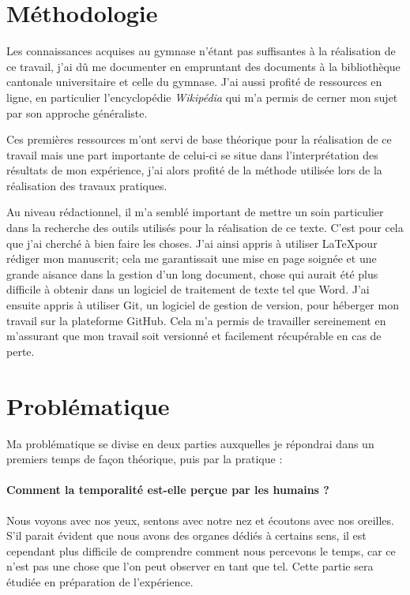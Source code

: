 \documentclass[12pt,fleqn,oneside,openany,]{book} %
\begin{document}
\section{Méthodologie} \label{sec:methodologie}
Les connaissances acquises au gymnase n'étant pas suffisantes à la réalisation de ce travail, j'ai dû me documenter en empruntant des documents à la bibliothèque cantonale universitaire et celle du gymnase. J'ai aussi profité de ressources en ligne, en particulier l'encyclopédie \textit{Wikipédia} qui m'a permis de cerner mon sujet par son approche généraliste.

Ces premières ressources m'ont servi de base théorique pour la réalisation de ce travail mais une part importante de celui-ci se situe dans l'interprétation des résultats de mon expérience, j'ai alors profité de la méthode utilisée lors de la réalisation des travaux pratiques.

Au niveau rédactionnel, il m'a semblé important de mettre un soin particulier dans la recherche des outils utilisés pour la réalisation de ce texte. C'est pour cela que j'ai cherché à bien faire les choses. J'ai ainsi appris à utiliser \LaTeX pour rédiger mon manuscrit; cela me garantissait une mise en page soignée et une grande aisance dans la gestion d'un long document, chose qui aurait été plus difficile à obtenir dans un logiciel de traitement de texte tel que Word. J'ai ensuite appris à utiliser Git, un logiciel de gestion de version, pour héberger mon travail sur la plateforme GitHub. Cela m'a permis de travailler sereinement en m'assurant que mon travail soit versionné et facilement récupérable en cas de perte.

\section{Problématique} \label{sec:problematique}
Ma problématique se divise en deux parties auxquelles je répondrai dans un premiers temps de façon théorique, puis par la pratique :

\paragraph{Comment la temporalité est-elle perçue par les humains ?} Nous voyons avec nos yeux, sentons avec notre nez et écoutons avec nos oreilles. S'il parait évident que nous avons des organes dédiés à certains sens, il est cependant plus difficile de comprendre comment nous percevons le temps, car ce n'est pas une chose que l'on peut observer en tant que tel. Cette partie sera étudiée en préparation de l'expérience. 
\end{document}
